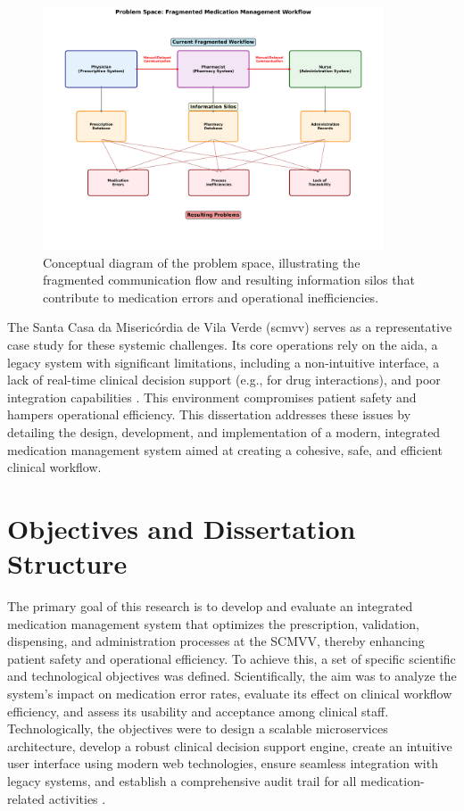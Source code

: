 \begin{figure}[htbp]
    \centering
    \includegraphics[width=0.9\textwidth]{images/generated/problem_space_diagram.png}
    \caption{Conceptual diagram of the problem space, illustrating the fragmented communication flow and resulting information silos that contribute to medication errors and operational inefficiencies.}
    \label{fig:problem_space}
\end{figure}

The Santa Casa da Misericórdia de Vila Verde (\gls{scmvv}) serves as a representative case study for these systemic challenges. Its core operations rely on the \gls{aida}, a legacy system with significant limitations, including a non-intuitive interface, a lack of real-time clinical decision support (e.g., for drug interactions), and poor integration capabilities \cite{moss2015, bowles2020}. This environment compromises patient safety and hampers operational efficiency. This dissertation addresses these issues by detailing the design, development, and implementation of a modern, integrated medication management system aimed at creating a cohesive, safe, and efficient clinical workflow.

\section{Objectives and Dissertation Structure}

The primary goal of this research is to develop and evaluate an integrated medication management system that optimizes the prescription, validation, dispensing, and administration processes at the SCMVV, thereby enhancing patient safety and operational efficiency. To achieve this, a set of specific scientific and technological objectives was defined. Scientifically, the aim was to analyze the system's impact on medication error rates, evaluate its effect on clinical workflow efficiency, and assess its usability and acceptance among clinical staff. Technologically, the objectives were to design a scalable microservices architecture, develop a robust clinical decision support engine, create an intuitive user interface using modern web technologies, ensure seamless integration with legacy systems, and establish a comprehensive audit trail for all medication-related activities \cite{belle2013, misra2023, mandl2020, european2016}.

